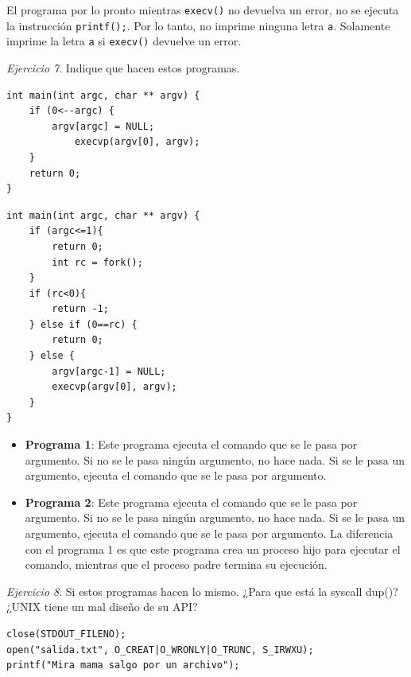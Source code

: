 \documentclass[12pt]{article}
\begin{document}
\begin{rta}
    El programa por lo pronto mientras \texttt{execv()} no devuelva un error, no se ejecuta la instrucción \texttt{printf();}. Por lo tanto, no imprime ninguna letra \texttt{a}. Solamente imprime la letra \texttt{a} si \texttt{execv()} devuelve un error.
\end{rta}

\noindent \textit{Ejercicio 7}. Indique que hacen estos programas.

\begin{lstlisting}[style=CStyle]
int main(int argc, char ** argv) {
    if (0<--argc) {
        argv[argc] = NULL;
            execvp(argv[0], argv);
    }
    return 0;
}
\end{lstlisting}

\begin{lstlisting}[style=CStyle]
int main(int argc, char ** argv) {
    if (argc<=1){
        return 0;
        int rc = fork();
    }
    if (rc<0){
        return -1;
    } else if (0==rc) {
        return 0;
    } else {
        argv[argc-1] = NULL;
        execvp(argv[0], argv);
    }
}
\end{lstlisting}

\begin{rta}
    \begin{itemize}
        \item \textbf{Programa 1}: Este programa ejecuta el comando que se le pasa por argumento. Si no se le pasa ningún argumento, no hace nada. Si se le pasa un argumento, ejecuta el comando que se le pasa por argumento.
        \item \textbf{Programa 2}: Este programa ejecuta el comando que se le pasa por argumento. Si no se le pasa ningún argumento, no hace nada. Si se le pasa un argumento, ejecuta el comando que se le pasa por argumento. La diferencia con el programa 1 es que este programa crea un proceso hijo para ejecutar el comando, mientras que el proceso padre termina su ejecución.
    \end{itemize}
\end{rta}

\noindent \textit{Ejercicio 8}. Si estos programas hacen lo mismo. ¿Para que está la syscall dup()? ¿UNIX tiene un mal diseño de su API?

\begin{lstlisting}[style=CStyle]
close(STDOUT_FILENO);
open("salida.txt", O_CREAT|O_WRONLY|O_TRUNC, S_IRWXU);
printf("Mira mama salgo por un archivo");
\end{lstlisting}
\end{document}
